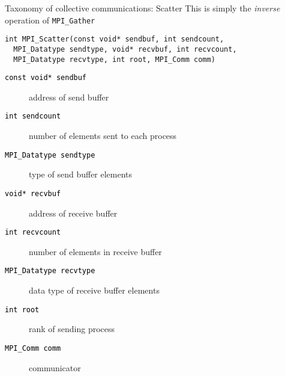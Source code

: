 \documentclass[xcolor={svgnames,usenames}]{beamer}
\begin{document}
\begin{frame}[fragile]{Taxonomy of collective communications: Scatter}
This is simply the \emph{inverse} operation of \texttt{MPI_Gather}
\begin{verbatim}
int MPI_Scatter(const void* sendbuf, int sendcount, 
  MPI_Datatype sendtype, void* recvbuf, int recvcount, 
  MPI_Datatype recvtype, int root, MPI_Comm comm)
\end{verbatim}
\begin{description}
\item[\textcolor{black}{\texttt{const void* sendbuf}}] \alert<2>{address of send buffer}
\item[\textcolor{black}{\texttt{int sendcount}}] \alert<2>{number of elements sent to each process}
\item[\textcolor{black}{\texttt{MPI_Datatype sendtype}}] \alert<2>{type of send buffer elements}
\item[\textcolor{black}{\texttt{void* recvbuf}}] address of receive buffer
\item[\textcolor{black}{\texttt{int recvcount}}] number of elements in receive buffer 
\item[\textcolor{black}{\texttt{MPI_Datatype recvtype}}] data type of receive buffer elements 
\item[\textcolor{black}{\texttt{int root}}]rank of sending process 
\item[\textcolor{black}{\texttt{MPI_Comm comm}}] communicator 
\end{description}
\end{frame}
\end{document}
